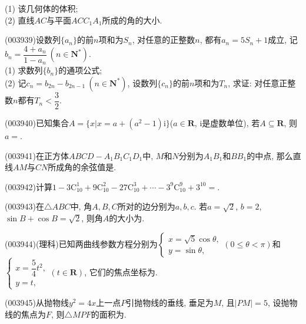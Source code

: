 (1) 该几何体的体积;\\
(2) 直线$AC$与平面$ACC_1A_1$所成的角的大小.
\begin{center}
\end{center}
\item (003939)设数列$\{a_n\}$的前$n$项和为$S_n$, 对任意的正整数$n$, 都有$a_n=5S_n+1$成立, 记$b_n=\dfrac{4+a_n}{1-a_n} \ (n\in\mathbf{N}^*)$.\\
(1) 求数列$\{b_n\}$的通项公式;\\
(2) 记$c_n=b_{2n}-b_{2n-1} \ (n\in \mathbf{N}^*)$, 设数列$\{c_n\}$的前$n$项和为$T_n$, 求证: 对任意正整数$n$都有$T_n<\dfrac 32$.
\item (003940)已知集合$A=\{x|x=a+(a^2-1)\mathrm{i}\}$($a\in \mathbf{R}$, $\mathrm{i}$是虚数单位), 若$A\subseteq \mathbf{R}$, 则$a=$.
\item (003941)在正方体$ABCD-A_1B_1C_1D_1$中, $M$和$N$分别为$A_1B_1$和$BB_1$的中点, 那么直线$AM$与$CN$所成角的余弦值是.
\item (003942)计算$1-3\mathrm{C}_{10}^1+9\mathrm{C}_{10}^2-27\mathrm{C}_{10}^3+\cdots-3^9\mathrm{C}_{10}^9+3^{10}=$.
\item (003943)在$\triangle ABC$中, 角$A,B,C$所对的边分别为$a,b,c$. 若$a=\sqrt{2}$, $b=2$, $\sin B+\cos B=\sqrt{2}$, 则角$A$的大小为.
\item (003944)(理科)已知两曲线参数方程分别为$\begin{cases}x=\sqrt{5}\cos\theta,\\y=\sin\theta,\end{cases} (0\le \theta<\pi)$和$\begin{cases}
x=\dfrac 54 t^2, \\ y=t, \end{cases}
(t\in \mathbf{R})$, 它们的焦点坐标为.
\item (003945)从抛物线$y^2=4x$上一点$P$引抛物线的垂线, 垂足为$M$, 且$|PM|=5$, 设抛物线的焦点为$F$, 则$\triangle MPF$的面积为.
